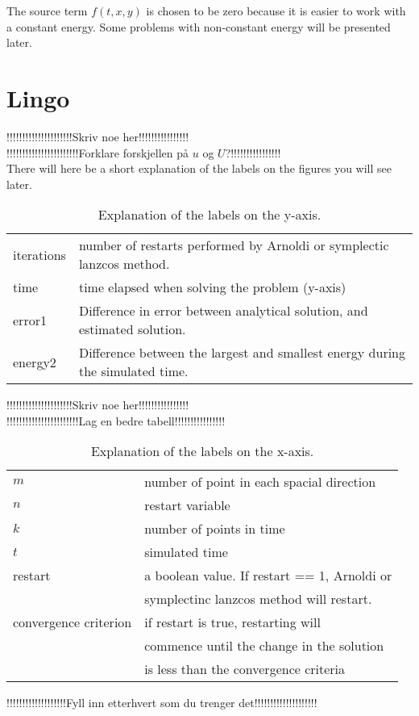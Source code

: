 The source term $f(t,x,y)$ is chosen to be zero because it is easier to work with a constant energy. Some problems with non-constant energy will be presented later.


\section{Lingo}
!!!!!!!!!!!!!!!!!!!!!Skriv noe her!!!!!!!!!!!!!!!!\\
!!!!!!!!!!!!!!!!!!!!!!!Forklare forskjellen på $u$ og $U$?!!!!!!!!!!!!!!!!\\
There will here be a short explanation of the labels on the figures you will see later. 
\begin{table}[h]
\centering
\begin{tabular}{l|l}
 iterations& number of restarts performed by Arnoldi or symplectic lanzcos method.  \\
 time & time elapsed when solving the problem (y-axis) \\
 error1 &  Difference in error between analytical solution, and estimated solution. \\
 energy2 & Difference between the largest and smallest energy during the simulated time. \\
\end{tabular}
\caption{ Explanation of the labels on the y-axis. }
\label{tab:ylabels}
\end{table}

!!!!!!!!!!!!!!!!!!!!!Skriv noe her!!!!!!!!!!!!!!!!\\
!!!!!!!!!!!!!!!!!!!!!!!Lag en bedre tabell!!!!!!!!!!!!!!!!\\

\begin{table}[h]
\centering
\begin{tabular}{l l}
$m$ & number of point in each spacial direction \\
$n$ & restart variable \\
$k$ & number of points in time \\
$t$ & simulated time \\
restart& a boolean value. If restart == 1, Arnoldi or \\&symplectinc lanzcos method will restart. \\
convergence criterion & if restart is true, restarting will\\& commence until the change in the solution\\& is less than the convergence criteria \\
\end{tabular}
\caption{ Explanation of the labels on the x-axis. }
\label{tab:xlabels}
\end{table}

!!!!!!!!!!!!!!!!!!!Fyll inn etterhvert som du trenger det!!!!!!!!!!!!!!!!!!!!\\